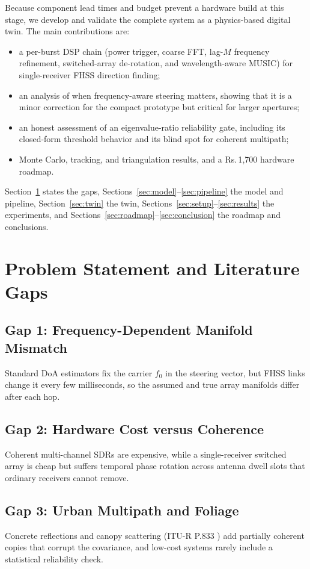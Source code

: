 \documentclass[conference]{IEEEtran}
\begin{document}
Because component lead times and budget prevent a hardware build at this stage, we develop and validate the complete system as a physics-based digital twin. The main contributions are:
\begin{itemize}
\item a per-burst DSP chain (power trigger, coarse FFT, lag-$M$ frequency refinement, switched-array de-rotation, and wavelength-aware MUSIC) for single-receiver FHSS direction finding;
\item an analysis of when frequency-aware steering matters, showing that it is a minor correction for the compact prototype but critical for larger apertures;
\item an honest assessment of an eigenvalue-ratio reliability gate, including its closed-form threshold behavior and its blind spot for coherent multipath;
\item Monte Carlo, tracking, and triangulation results, and a Rs.\,1{,}700 hardware roadmap.
\end{itemize}
Section~\ref{sec:gaps} states the gaps, Sections~\ref{sec:model}--\ref{sec:pipeline} the model and pipeline, Section~\ref{sec:twin} the twin, Sections~\ref{sec:setup}--\ref{sec:results} the experiments, and Sections~\ref{sec:roadmap}--\ref{sec:conclusion} the roadmap and conclusions.

\section{Problem Statement and Literature Gaps}\label{sec:gaps}
\subsection{Gap 1: Frequency-Dependent Manifold Mismatch}
Standard DoA estimators fix the carrier $f_0$ in the steering vector, but FHSS links change it every few milliseconds, so the assumed and true array manifolds differ after each hop.

\subsection{Gap 2: Hardware Cost versus Coherence}
Coherent multi-channel SDRs are expensive, while a single-receiver switched array is cheap but suffers temporal phase rotation across antenna dwell slots that ordinary receivers cannot remove.

\subsection{Gap 3: Urban Multipath and Foliage}
Concrete reflections and canopy scattering (ITU-R P.833 \cite{itu833}) add partially coherent copies that corrupt the covariance, and low-cost systems rarely include a statistical reliability check.
\end{document}

